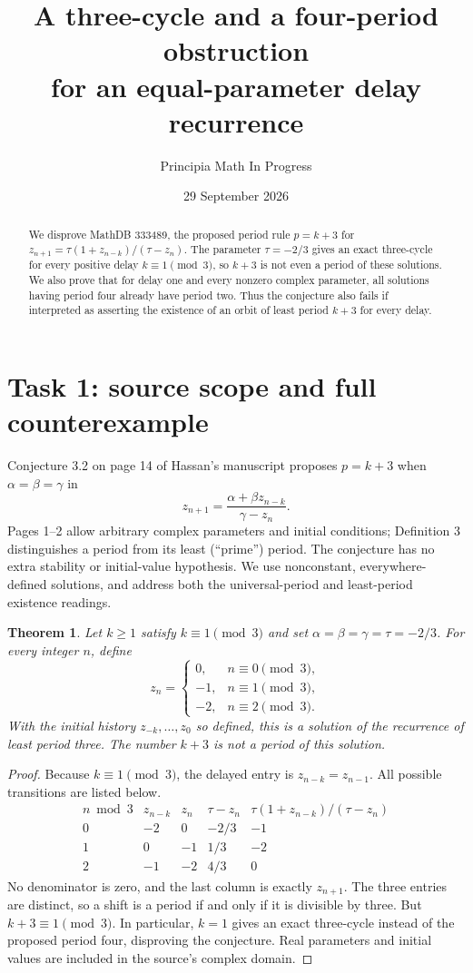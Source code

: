 \documentclass[11pt]{article}
\title{A three-cycle and a four-period obstruction\protect\\for an equal-parameter delay recurrence}
\author{Principia Math In Progress}
\date{29 September 2026}
\newtheorem{theorem}{Theorem}
\begin{document}
\maketitle
\begin{abstract}
We disprove MathDB 333489, the proposed period rule $p=k+3$ for
$z_{n+1}=\tau(1+z_{n-k})/(\tau-z_n)$.
The parameter $\tau=-2/3$ gives an exact three-cycle for every positive
delay $k\equiv1\pmod3$, so $k+3$ is not even a period of these solutions.
We also prove that for delay one and every nonzero complex parameter,
all solutions having period four already have period two. Thus the
conjecture also fails if interpreted as asserting the existence of an
orbit of least period $k+3$ for every delay.
\end{abstract}

\section*{Task 1: source scope and full counterexample}
Conjecture 3.2 on page 14 of Hassan's manuscript \cite{Hassan} proposes
$p=k+3$ when $\alpha=\beta=\gamma$ in
\[
 z_{n+1}=\frac{\alpha+\beta z_{n-k}}{\gamma-z_n}.
\]
Pages 1--2 allow arbitrary complex parameters and initial conditions;
Definition 3 distinguishes a period from its least (``prime'') period.
The conjecture has no extra stability or initial-value hypothesis.
We use nonconstant, everywhere-defined solutions, and address both
the universal-period and least-period existence readings.

\begin{theorem}\label{counter}
Let $k\ge1$ satisfy $k\equiv1\pmod3$ and set
$\alpha=\beta=\gamma=\tau=-2/3$. For every integer $n$, define
\[
 z_n=\begin{cases}
 0,&n\equiv0\pmod3,\\
 -1,&n\equiv1\pmod3,\\
 -2,&n\equiv2\pmod3.
 \end{cases}
\]
With the initial history $z_{-k},\ldots,z_0$ so defined, this is a
solution of the recurrence of least period three. The number $k+3$
is not a period of this solution.
\end{theorem}
\begin{proof}
Because $k\equiv1\pmod3$, the delayed entry is $z_{n-k}=z_{n-1}$.
All possible transitions are listed below.
\[
\begin{array}{c|r|r|c|r}
n\bmod3&z_{n-k}&z_n&\tau-z_n&
\tau(1+z_{n-k})/(\tau-z_n)\\\hline
0&-2&0&-2/3&-1\\
1&0&-1&1/3&-2\\
2&-1&-2&4/3&0
\end{array}
\]
No denominator is zero, and the last column is exactly $z_{n+1}$.
The three entries are distinct, so a shift is a period if and only if
it is divisible by three. But $k+3\equiv1\pmod3$.
In particular, $k=1$ gives an exact three-cycle instead of the proposed
period four, disproving the conjecture. Real parameters and initial
values are included in the source's complex domain.
\end{proof}
\end{document}
